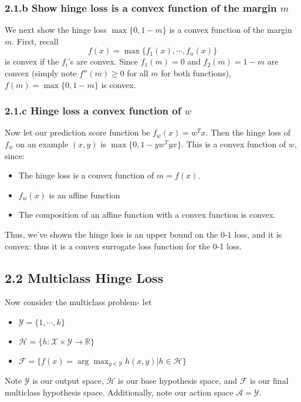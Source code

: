 \documentclass[paper=a4, fontsize=11pt]{scrartcl} %
\numberwithin{equation}{section} %
\numberwithin{figure}{section} %
\numberwithin{table}{section} %
\begin{document}
\subsubsection*{2.1.b Show hinge loss is a convex function of the margin $m$}

We next show the hinge loss $\max\{0, 1 - m\}$ is a convex function of the margin $m$. First, recall
\[f(x) = \max\{f_1(x), \cdots, f_n(x)\}\]
is convex if the $f_i$'s are convex. Since $f_1(m) = 0$ and $f_2(m) = 1 - m$ are convex (simply note $f''(m) \geq 0$ for all $m$ for both functions), $f(m) = \max\{0, 1 - m\}$ is convex.

\subsubsection*{2.1.c Hinge loss a convex function of $w$}

Now let our prediction score function be $f_w(x) = w^T x$. Then the hinge loss of $f_w$ on an example $(x,y)$ is $\max\{0, 1 - yw^Tyx\}$. This is a convex function of $w$, since:
\begin{itemize}
\item The hinge loss is a convex function of $m = f(x)$.
\item $f_w(x)$ is an affine function
\item The composition of an affine function with a convex function is convex.
\end{itemize}

Thus, we've shown the hinge loss is an upper bound on the 0-1 loss, and it is convex: thus it is a convex surrogate loss function for the 0-1 loss. 

\subsection*{2.2 Multiclass Hinge Loss}

Now consider the multiclass problem- let
\begin{itemize}
\item $\mathcal{Y} = \{1, \cdots, k\}$
\item $\mathcal{H} = \{h: \mathcal{X} \times \mathcal{Y} \to \mathbb{R}\}$
\item $\mathcal{F} = \{f(x) = \arg \max_{y \in \mathcal{Y}} h(x, y) | h \in \mathcal{H}\}$
\end{itemize}
Note $\mathcal{Y}$ is our output space, $\mathcal{H}$ is our base hypothesis space, and $\mathcal{F}$ is our final multiclass hypothesis space. Additionally, note our action space $\mathcal{A} = \mathcal{Y}$.\\
\end{document}
